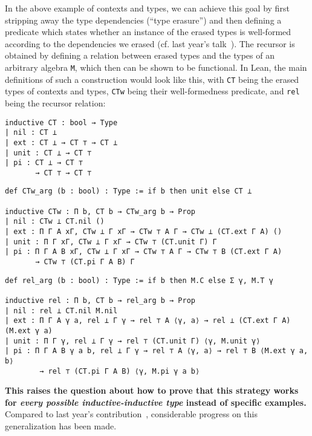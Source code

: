 \documentclass{easychair}
\begin{document}
In the above example of contexts and types, we can achieve this goal by
first stripping away the type dependencies (``type erasure'') and then defining
a predicate which states whether an instance of the erased types is well-formed
according to the dependencies we erased (cf. last year's talk~\cite{types2018}).
The recursor is obtained by defining a relation between erased types and the
types of an arbitrary algebra \texttt{M}, which then can be shown to be functional.
In Lean, the main definitions of such a construction would look like this, with
\texttt{CT} being the erased types of contexts and types, \texttt{CTw} being their well-formedness predicate,
and \texttt{rel} being the recursor relation:
\noindent
\begin{minipage}{.31\textwidth}
\begin{lstlisting}
inductive CT : bool → Type
| nil : CT ⊥
| ext : CT ⊥ → CT ⊤ → CT ⊥
| unit : CT ⊥ → CT ⊤
| pi : CT ⊥ → CT ⊤
       → CT ⊤ → CT ⊤
\end{lstlisting}
\end{minipage} \hfill
\begin{minipage}{.68\textwidth}
\begin{lstlisting}
def CTw_arg (b : bool) : Type := if b then unit else CT ⊥

inductive CTw : Π b, CT b → CTw_arg b → Prop
| nil : CTw ⊥ CT.nil ()
| ext : Π Γ A xΓ, CTw ⊥ Γ xΓ → CTw ⊤ A Γ → CTw ⊥ (CT.ext Γ A) ()
| unit : Π Γ xΓ, CTw ⊥ Γ xΓ → CTw ⊤ (CT.unit Γ) Γ
| pi : Π Γ A B xΓ, CTw ⊥ Γ xΓ → CTw ⊤ A Γ → CTw ⊤ B (CT.ext Γ A)
       → CTw ⊤ (CT.pi Γ A B) Γ
\end{lstlisting}
\end{minipage}
\noindent\begin{minipage}{\textwidth}\begin{lstlisting}
def rel_arg (b : bool) : Type := if b then M.C else Σ γ, M.T γ

inductive rel : Π b, CT b → rel_arg b → Prop
| nil : rel ⊥ CT.nil M.nil
| ext : Π Γ A γ a, rel ⊥ Γ γ → rel ⊤ A ⟨γ, a⟩ → rel ⊥ (CT.ext Γ A) (M.ext γ a)
| unit : Π Γ γ, rel ⊥ Γ γ → rel ⊤ (CT.unit Γ) ⟨γ, M.unit γ⟩
| pi : Π Γ A B γ a b, rel ⊥ Γ γ → rel ⊤ A ⟨γ, a⟩ → rel ⊤ B ⟨M.ext γ a, b⟩
        → rel ⊤ (CT.pi Γ A B) ⟨γ, M.pi γ a b⟩
\end{lstlisting}
\end{minipage}

\noindent \textbf{This raises the question about how to prove that this strategy works for \emph{every
possible inductive-inductive type} instead of specific examples.}
Compared to last year's contribution~\cite{types2018}, considerable progress on this
generalization has been made.
\end{document}
